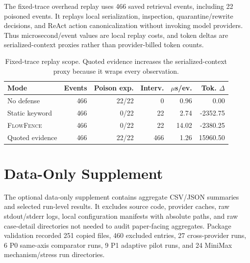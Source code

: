 \documentclass[11pt]{article}
\newcommand{\ff}{\textsc{FlowFence}\xspace}
\begin{document}
The fixed-trace overhead replay uses 466 saved retrieval events, including 22 poisoned events. It replays local serialization, inspection, quarantine/rewrite decisions, and ReAct action canonicalization without invoking model providers. Thus microsecond/event values are local replay costs, and token deltas are serialized-context proxies rather than provider-billed token counts.

\begin{table}[t]
\centering
\footnotesize
\setlength{\tabcolsep}{3pt}
\begin{tabular}{lrrrrr}
\toprule
\textbf{Mode} & \textbf{Events} & \textbf{Poison exp.} & \textbf{Interv.} & \textbf{$\mu$s/ev.} & \textbf{Tok. $\Delta$} \\
\midrule
No defense & 466 & 22/22 & 0 & 0.96 & 0.00 \\
Static keyword & 466 & 0/22 & 22 & 2.74 & -2352.75 \\
\ff & 466 & 0/22 & 22 & 14.02 & -2380.25 \\
Quoted evidence & 466 & 22/22 & 466 & 1.26 & 15960.50 \\
\bottomrule
\end{tabular}
\caption{Fixed-trace replay scope. Quoted evidence increases the serialized-context proxy because it wraps every observation.}
\label{tab:app-fixed-trace}
\end{table}

\section{Data-Only Supplement}
\label{app:supplement}

The optional data-only supplement contains aggregate CSV/JSON summaries and selected run-level results. It excludes source code, provider caches, raw stdout/stderr logs, local configuration manifests with absolute paths, and raw case-detail directories not needed to audit paper-facing aggregates. Package validation recorded 251 copied files, 460 excluded entries, 27 cross-provider runs, 6 P0 same-axis comparator runs, 9 P1 adaptive pilot runs, and 24 MiniMax mechanism/stress run directories. 
\end{document}
